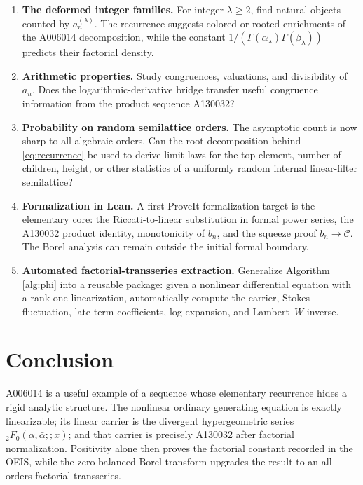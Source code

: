\documentclass[11pt,a4paper]{article}
\theoremstyle{definition}
\theoremstyle{remark}
\newcommand{\constC}{\mathcal{C}}
\begin{document}
\begin{enumerate}[label=\textbf{Q\arabic*.}]
\item \textbf{The deformed integer families.}
For integer \(\lambda\ge2\), find natural objects counted by \(a_n^{(\lambda)}\).  The recurrence suggests colored or rooted enrichments of the A006014 decomposition, while the constant \(1/(\Gamma(\alpha_\lambda)\Gamma(\beta_\lambda))\) predicts their factorial density.

\item \textbf{Arithmetic properties.}
Study congruences, valuations, and divisibility of \(a_n\).  Does the logarithmic-derivative bridge transfer useful congruence information from the product sequence A130032?

\item \textbf{Probability on random semilattice orders.}
The asymptotic count is now sharp to all algebraic orders.  Can the root decomposition behind \eqref{eq:recurrence} be used to derive limit laws for the top element, number of children, height, or other statistics of a uniformly random internal linear-filter semilattice?

\item \textbf{Formalization in Lean.}
A first ProveIt formalization target is the elementary core: the Riccati-to-linear substitution in formal power series, the A130032 product identity, monotonicity of \(b_n\), and the squeeze proof \(b_n\to\constC\).  The Borel analysis can remain outside the initial formal boundary.

\item \textbf{Automated factorial-transseries extraction.}
Generalize Algorithm \ref{alg:phi} into a reusable package: given a nonlinear differential equation with a rank-one linearization, automatically compute the carrier, Stokes fluctuation, late-term coefficients, log expansion, and Lambert--\(W\) inverse.
\end{enumerate}

\section{Conclusion}

A006014 is a useful example of a sequence whose elementary recurrence hides a rigid analytic structure.  The nonlinear ordinary generating equation is exactly linearizable; its linear carrier is the divergent hypergeometric series \({}_2F_0(\alpha,\bar\alpha;;x)\); and that carrier is precisely A130032 after factorial normalization.  Positivity alone then proves the factorial constant recorded in the OEIS, while the zero-balanced Borel transform upgrades the result to an all-orders factorial transseries.
\end{document}

